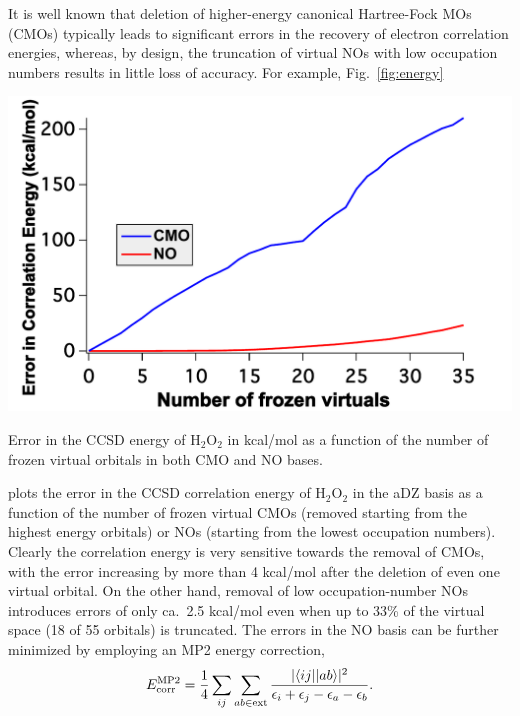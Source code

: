 It is well known that deletion of higher-energy canonical Hartree-Fock MOs
(CMOs) typically leads to significant errors in the recovery of electron
correlation energies, whereas, by design, the truncation of virtual NOs with
low occupation numbers results in little loss of accuracy.\cite{Landau10,Taube05,Taube08}
For example, Fig.~\ref{fig:energy} 
\begin{MyFigure}[h!]
\centering
\includegraphics[width=0.6\linewidth]{figures_fvno/energy.pdf}
\caption{{\footnotesize Error in the CCSD energy of H$_2$O$_2$ in kcal/mol as a function of the number of frozen virtual orbitals in both CMO and NO bases.}}
\label{fig:energy}
\end{MyFigure}
plots the error in the CCSD correlation energy of H$_2$O$_2$ in the aDZ basis as a function of
the number of frozen virtual CMOs (removed starting from the highest energy
orbitals) or NOs (starting from the lowest occupation numbers).  Clearly the
correlation energy is very sensitive towards the removal of CMOs, with the
error increasing by more than 4 kcal/mol after the deletion of even one
virtual orbital.  On the other hand, removal of low occupation-number NOs
introduces errors of only ca.\ 2.5 kcal/mol even when up to 33\% of the
virtual space (18 of 55 orbitals) is truncated.  The errors in
the NO basis can be further minimized by employing an MP2 energy correction,
\\
\begin{equation}
E^{\rm MP2}_{\rm corr} = \frac{1}{4} \sum_{ij} \sum_{ab \in {\rm ext}} \frac{|\langle
ij||ab\rangle|^2}{\epsilon_i + \epsilon_j - \epsilon_a - \epsilon_b}.
\label{Eq:MP2}
\end{equation}
\\
